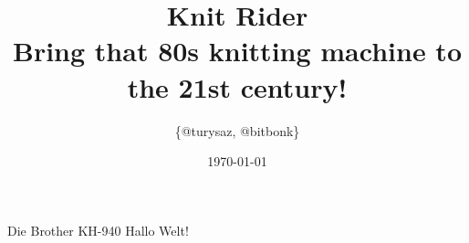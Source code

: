 \documentclass{beamer}
\author{\{@turysaz, @bitbonk\}}
\date{\today{}}
\title{\Huge{Knit Rider}\\
    \large{Bring that 80s knitting machine to the 21st century!}
}
\begin{document}
\maketitle

\begin{frame}{Die Brother KH-940}
    Hallo Welt!
\end{frame}
\end{document}
